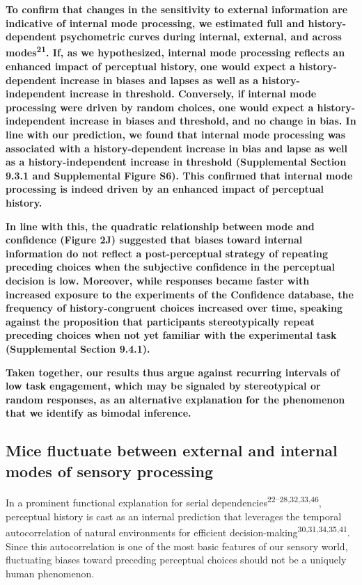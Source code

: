 \documentclass[
]{article}
\begin{document}
\textbf{To confirm that changes in the sensitivity to external
information are indicative of internal mode processing, we estimated
full and history-dependent psychometric curves during internal,
external, and across modes\textsuperscript{21}. If, as we hypothesized,
internal mode processing reflects an enhanced impact of perceptual
history, one would expect a history-dependent increase in biases and
lapses as well as a history-independent increase in threshold.
Conversely, if internal mode processing were driven by random choices,
one would expect a history-independent increase in biases and threshold,
and no change in bias. In line with our prediction, we found that
internal mode processing was associated with a history-dependent
increase in bias and lapse as well as a history-independent increase in
threshold (Supplemental Section 9.3.1 and Supplemental Figure S6). This
confirmed that internal mode processing is indeed driven by an enhanced
impact of perceptual history.}

\textbf{In line with this, the quadratic relationship between mode and
confidence (Figure 2J) suggested that biases toward internal information
do not reflect a post-perceptual strategy of repeating preceding choices
when the subjective confidence in the perceptual decision is low.
Moreover, while responses became faster with increased exposure to the
experiments of the Confidence database, the frequency of
history-congruent choices increased over time, speaking against the
proposition that participants stereotypically repeat preceding choices
when not yet familiar with the experimental task (Supplemental Section
9.4.1).}

\textbf{Taken together, our results thus argue against recurring
intervals of low task engagement, which may be signaled by stereotypical
or random responses, as an alternative explanation for the phenomenon
that we identify as bimodal inference.}

\hypertarget{mice-fluctuate-between-external-and-internal-modes-of-sensory-processing}{%
\subsection{Mice fluctuate between external and internal modes of
sensory
processing}\label{mice-fluctuate-between-external-and-internal-modes-of-sensory-processing}}

In a prominent functional explanation for serial
dependencies\textsuperscript{22--28,32,33,46}, perceptual history is
cast as an internal prediction that leverages the temporal
autocorrelation of natural environments for efficient
decision-making\textsuperscript{30,31,34,35,41}. Since this
autocorrelation is one of the most basic features of our sensory world,
fluctuating biases toward preceding perceptual choices should not be a
uniquely human phenomenon.
\end{document}
